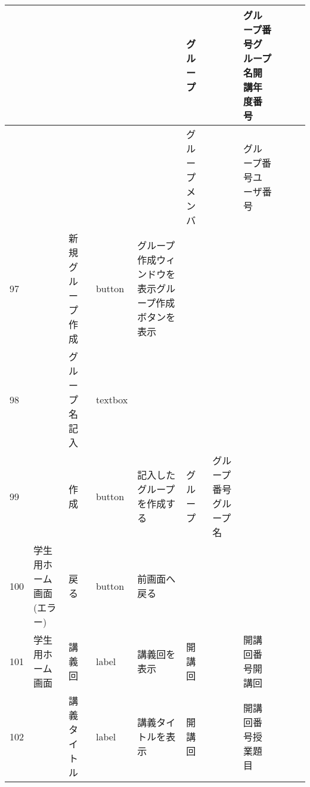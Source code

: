 \begin{landscape}
\begin{table}[]
\begin{tabular}{|l|l|l|l|l|l|l|l|l|l|l|}
    &               &                  &          &                                                                   & グループ    &                       & グループ番号グループ名開講年度番号  &                 &                               &                                                                \\ \hline
    &               &                  &          &                                                                   & グループメンバ &                       & グループ番号ユーザ番号        &                 &                               &                                                                \\ \hline
97  &               & 新規グループ作成         & button   & グループ作成ウィンドウを表示グループ作成ボタンを表示                                        &         &                       &                    &                 &                               &                                                                \\ \hline
98  &               & グループ名記入          & textbox  &                                                                   &         &                       &                    &                 &                               &                                                                \\ \hline
99  &               & 作成               & button   & 記入したグループを作成する                                                     & グループ    & グループ番号グループ名           &                    &                 &                               &                                                                \\ \hline
100 & 学生用ホーム画面(エラー) & 戻る               & button   & 前画面へ戻る                                                            &         &                       &                    &                 &                               &                                                                \\ \hline
101 & 学生用ホーム画面      & 講義回              & label    & 講義回を表示                                                            & 開講回     &                       & 開講回番号開講回           &                 &                               &                                                                \\ \hline
102 &               & 講義タイトル           & label    & 講義タイトルを表示                                                         & 開講回     &                       & 開講回番号授業題目          &                 &                               &                                                                \\ \hline

\end{tabular}
\end{table}
\end{landscape}
